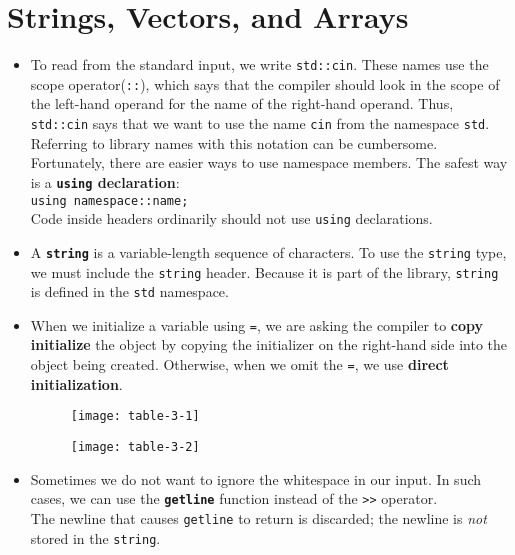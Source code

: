 \section{Strings, Vectors, and Arrays}
\begin{itemize}

\item
To read from the standard input, we write \texttt{std::cin}. These names use the scope operator(\texttt{::}), which says that the compiler should look in the scope of the left-hand operand for the name of the right-hand operand. Thus, \texttt{std::cin} says that we want to use the name \texttt{cin} from the namespace \texttt{std}.\\
Referring to library names with this notation can be cumbersome. Fortunately, there are easier ways to use namespace members. The safest way is a \textbf{\texttt{using} declaration}:\\
\hspace*{1em}\texttt{using namespace::name;}\\
Code inside headers ordinarily should not use \texttt{using} declarations.

\item
A \textbf{\texttt{string}} is a variable-length sequence of characters. To use the \texttt{string} type, we must include the \texttt{string} header. Because it is part of the library, \texttt{string} is defined in the \texttt{std} namespace.

\item
When we initialize a variable using \texttt{=}, we are asking the compiler to \textbf{copy initialize} the object by copying the initializer on the right-hand side into the object being created. Otherwise, when we omit the \texttt{=}, we use \textbf{direct initialization}.

\begin{figure}[ht]
\texttt{[image: table-3-1]}
\centering
\end{figure}

\begin{figure}[ht]
\texttt{[image: table-3-2]}
\centering
\end{figure}

\item
Sometimes we do not want to ignore the whitespace in our input. In such cases, we can use the \texttt{\textbf{getline}} function instead of the \texttt{>>} operator.\\
The newline that causes \texttt{getline} to return is discarded; the newline is \textit{not} stored in the \texttt{string}.


\end{itemize}

